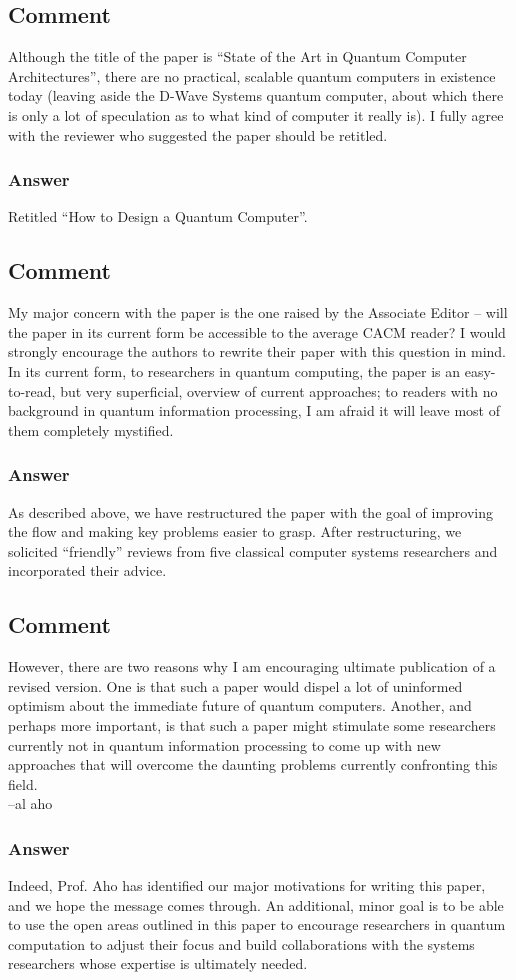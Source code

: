\documentclass{article}
\newcommand{\comment}{\subsection{Comment}\em}
\newcommand{\answer}{\rm \subsubsection*{Answer}}
\begin{document}
\comment

Although the title of the paper is ``State of the Art in Quantum
Computer Architectures'', there are no practical, scalable quantum
computers in existence today (leaving aside the D-Wave Systems quantum
computer, about which there is only a lot of speculation as to what
kind of computer it really is). I fully agree with the reviewer who
suggested the paper should be retitled.

\answer

Retitled ``How to Design a Quantum Computer''.

\comment

My major concern with the paper is the one raised by the Associate
Editor -- will the paper in its current form be accessible to the
average CACM reader? I would strongly encourage the authors to rewrite
their paper with this question in mind. In its current form, to
researchers in quantum computing, the paper is an easy-to-read, but
very superficial, overview of current approaches; to readers with no
background in quantum information processing, I am afraid it will
leave most of them completely mystified.

\answer

As described above, we have restructured the paper with the goal of
improving the flow and making key problems easier to grasp.  After
restructuring, we solicited ``friendly'' reviews from five classical
computer systems researchers and incorporated their advice.

\comment

However, there are two reasons why I am encouraging ultimate
publication of a revised version.  One is that such a paper would
dispel a lot of uninformed optimism about the immediate future of
quantum computers. Another, and perhaps more important, is that such a
paper might stimulate some researchers currently not in quantum
information processing to come up with new approaches that will
overcome the daunting problems currently confronting this field.\\
 --al aho

\answer

Indeed, Prof. Aho has identified our major motivations for writing
this paper, and we hope the message comes through.  An additional,
minor goal is to be able to use the open areas outlined in this paper
to encourage researchers in quantum computation to adjust their focus
and build collaborations with the systems researchers whose expertise
is ultimately needed.
\end{document}
